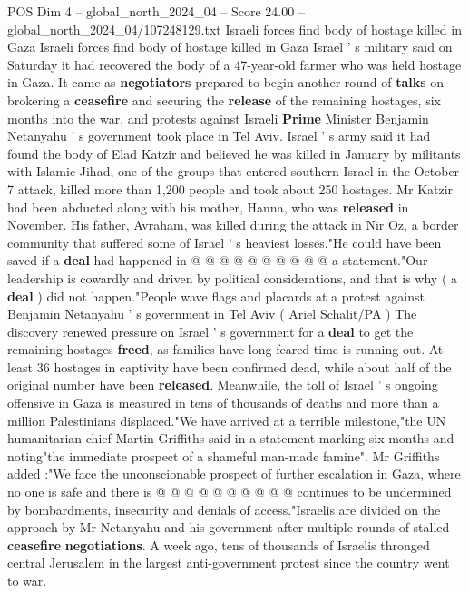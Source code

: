 \begin{textsample}{POS Dim 4 – global\_north\_2024\_04 – Score 24.00 – global\_north\_2024\_04/107248129.txt}  \label{ex:f4_pos_361}
Israeli forces find body of hostage killed in Gaza Israeli forces find body of hostage killed in Gaza Israel ' s military said on Saturday it had recovered the body of a 47-year-old farmer who was held hostage in Gaza.
It came as \textbf{negotiators} prepared to begin another round of \textbf{talks} on brokering a \textbf{ceasefire} and securing the \textbf{release} of the remaining hostages, six months into the war, and protests against Israeli \textbf{Prime} Minister Benjamin Netanyahu ' s government took place in Tel Aviv.
Israel ' s army said it had found the body of Elad Katzir and believed he was killed in January by militants with Islamic Jihad, one of the groups that entered southern Israel in the October 7 attack, killed more than 1,200 people and took about 250 hostages.
Mr Katzir had been abducted along with his mother, Hanna, who was \textbf{released} in November.
His father, Avraham, was killed during the attack in Nir Oz, a border community that suffered some of Israel ' s heaviest losses."He could have been saved if a \textbf{deal} had happened in @ @ @ @ @ @ @ @ @ @ a statement."Our leadership is cowardly and driven by political considerations, and that is why ( a \textbf{deal} ) did not happen."People wave flags and placards at a protest against Benjamin Netanyahu ' s government in Tel Aviv ( Ariel Schalit/PA ) The discovery renewed pressure on Israel ' s government for a \textbf{deal} to get the remaining hostages \textbf{freed}, as families have long feared time is running out.
At least 36 hostages in captivity have been confirmed dead, while about half of the original number have been \textbf{released}.
Meanwhile, the toll of Israel ' s ongoing offensive in Gaza is measured in tens of thousands of deaths and more than a million Palestinians displaced."We have arrived at a terrible milestone,"the UN humanitarian chief Martin Griffiths said in a statement marking six months and noting"the immediate prospect of a shameful man-made famine".
Mr Griffiths added :"We face the unconscionable prospect of further escalation in Gaza, where no one is safe and there is @ @ @ @ @ @ @ @ @ @ continues to be undermined by bombardments, insecurity and denials of access."Israelis are divided on the approach by Mr Netanyahu and his government after multiple rounds of stalled \textbf{ceasefire} \textbf{negotiations}.
A week ago, tens of thousands of Israelis thronged central Jerusalem in the largest anti-government protest since the country went to war.

\end{textsample}
